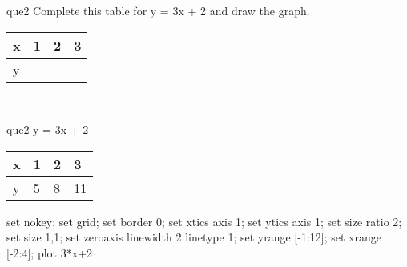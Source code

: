 \documentclass[13.5pt, varwidth=true]{beamer}
\begin{document}
\begin{frame}[shrink=19,fragile]
	\begin{beamercolorbox}[rounded=true, left, shadow=true,wd=14.8cm]{que2}
		 Complete this table for y = 3x + 2 and draw the graph. \\[0.3cm] \renewcommand{\arraystretch}{1.2}\begin{tabular}{|C|C|C|C|} \hline x & 1 & 2 & 3 \\ \hline y & & & \\ \hline \end{tabular}\\[0.3cm]
	\end{beamercolorbox}
\end{frame}
\begin{frame}[shrink=19,fragile]
	\begin{beamercolorbox}[rounded=true, left, shadow=true,wd=14.8cm]{que2}
		y = 3x + 2\renewcommand{\arraystretch}{1.2}\begin{tabular}{|C|C|C|C|} \hline x & 1 & 2 & 3 \\ \hline y & 5 & 8 & 11\\ \hline \end{tabular}\begin{gnuplot}[terminal=pdf] set nokey; set grid; set border 0; set xtics axis 1; set ytics axis 1; set size ratio 2; set size 1,1; set zeroaxis linewidth 2 linetype 1; set yrange [-1:12]; set xrange [-2:4]; plot 3*x+2 \end{gnuplot}
	\end{beamercolorbox}
\end{frame}
\end{document}
